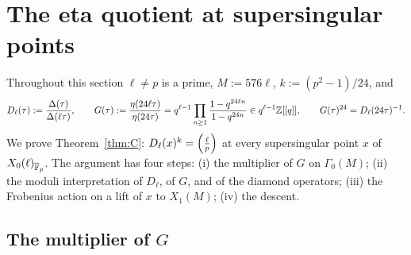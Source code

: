 %

\section{The eta quotient at supersingular points}\label{sec:eta}

Throughout this section $\ell\ne p$ is a prime, $M:=576\ell$, $k:=(p^2-1)/24$, and
\[
D_\ell(\tau):=\frac{\Delta(\tau)}{\Delta(\ell\tau)},\qquad
G(\tau):=\frac{\eta(24\ell\tau)}{\eta(24\tau)}=q^{\ell-1}\prod_{n\ge1}\frac{1-q^{24\ell n}}{1-q^{24n}}\in q^{\ell-1}\mathbb Z[[q]],
\qquad G(\tau)^{24}=D_\ell(24\tau)^{-1}.
\]
We prove Theorem~\ref{thm:C}: $D_\ell(x)^{k}=\left(\frac{\ell}{p}\right)$ at every supersingular point $x$ of
$X_0(\ell)_{\overline{\mathbb F}_p}$. The argument has four steps: (i) the multiplier of $G$ on $\Gamma_0(M)$; (ii) the
moduli interpretation of $D_\ell$, of $G$, and of the diamond operators; (iii) the Frobenius action
on a lift of $x$ to $X_1(M)$; (iv) the descent.

\subsection{The multiplier of \texorpdfstring{$G$}{G}}

